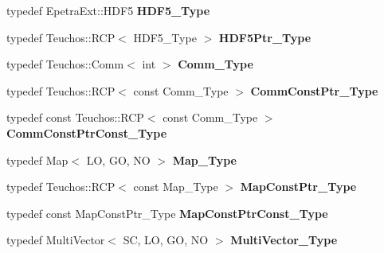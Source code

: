 \begin{DoxyCompactItemize}
typedef Epetra\+Ext\+::\+H\+D\+F5 {\bfseries H\+D\+F5\+\_\+\+Type}
\item 
\mbox{\label{classFEDD_1_1ExporterParaViewAMR_a0669ab1d36114d09d6ec07649e632b50}} 
typedef Teuchos\+::\+R\+CP$<$ H\+D\+F5\+\_\+\+Type $>$ {\bfseries H\+D\+F5\+Ptr\+\_\+\+Type}
\item 
\mbox{\label{classFEDD_1_1ExporterParaViewAMR_a40f4b74a0cc62f2e9181c131fd31ce14}} 
typedef Teuchos\+::\+Comm$<$ int $>$ {\bfseries Comm\+\_\+\+Type}
\item 
\mbox{\label{classFEDD_1_1ExporterParaViewAMR_a1f3569403ac40bf19493e68a6667f40a}} 
typedef Teuchos\+::\+R\+CP$<$ const Comm\+\_\+\+Type $>$ {\bfseries Comm\+Const\+Ptr\+\_\+\+Type}
\item 
\mbox{\label{classFEDD_1_1ExporterParaViewAMR_acdb41f657646474c2efb7f495f8725f7}} 
typedef const Teuchos\+::\+R\+CP$<$ const Comm\+\_\+\+Type $>$ {\bfseries Comm\+Const\+Ptr\+Const\+\_\+\+Type}
\item 
\mbox{\label{classFEDD_1_1ExporterParaViewAMR_a3c51bc6fe3a5ab13cd4e4fb44bff78c9}} 
typedef Map$<$ LO, GO, NO $>$ {\bfseries Map\+\_\+\+Type}
\item 
\mbox{\label{classFEDD_1_1ExporterParaViewAMR_af43e02540360a8c5acb334b2ce7d9c99}} 
typedef Teuchos\+::\+R\+CP$<$ const Map\+\_\+\+Type $>$ {\bfseries Map\+Const\+Ptr\+\_\+\+Type}
\item 
\mbox{\label{classFEDD_1_1ExporterParaViewAMR_a6550e2db4054f7535f9cb1758bb3397c}} 
typedef const Map\+Const\+Ptr\+\_\+\+Type {\bfseries Map\+Const\+Ptr\+Const\+\_\+\+Type}
\item 
\mbox{\label{classFEDD_1_1ExporterParaViewAMR_ae656c560626c10f5fc6722f43e4281fc}} 
typedef Multi\+Vector$<$ SC, LO, GO, NO $>$ {\bfseries Multi\+Vector\+\_\+\+Type}
\item 
\mbox{\label{classFEDD_1_1ExporterParaViewAMR_a8caa4d56423da54bdfa117997252a400}} 

\end{DoxyCompactItemize}
